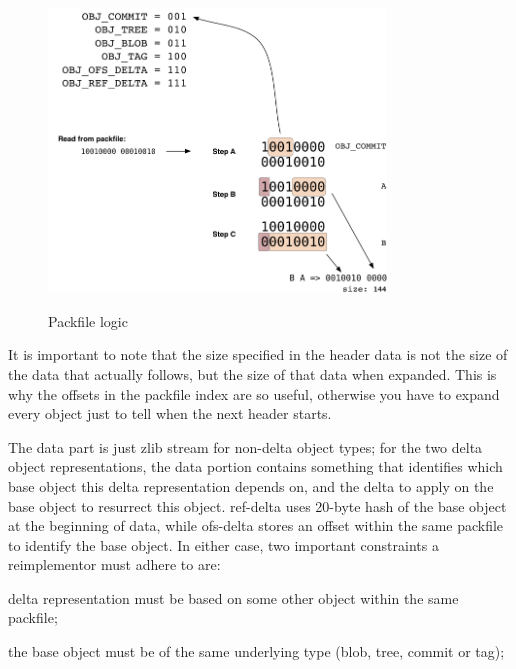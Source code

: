 \begin{figure}[tbp]
\centering
\includegraphics[width=0.80\textwidth]{content/git/packfile-logic.png}
\label{fig:packfilelogic}
\caption{Packfile logic}
\end{figure}

It is important to note that the size specified in the header data is not the
size of the data that actually follows, but the size of that data when
expanded. This is why the offsets in the packfile index are so useful,
otherwise you have to expand every object just to tell when the next header
starts.

The data part is just zlib stream for non-delta object types; for the two delta
object representations, the data portion contains something that identifies
which base object this delta representation depends on, and the delta to apply
on the base object to resurrect this object.  ref-delta uses 20-byte hash of
the base object at the beginning of data, while ofs-delta stores an offset
within the same packfile to identify the base object. In either case, two
important constraints a reimplementor must adhere to are:

delta representation must be based on some other object within the same
packfile;

the base object must be of the same underlying type (blob, tree, commit or
tag);
